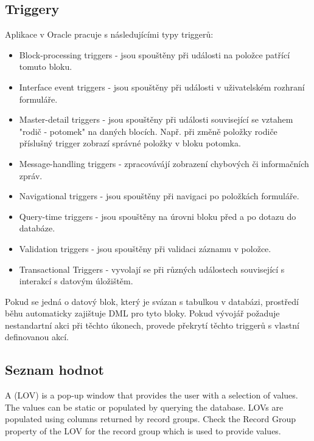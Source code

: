 \documentclass{bakalarka}
\begin{document}
\subsection{Triggery}
Aplikace v Oracle pracuje s následujícími typy triggerů:
\begin{itemize}
\item Block-processing triggers - jsou spouštěny při události na položce patřící tomuto bloku.
\item Interface event triggers - jsou spouštěny při události v uživatelském rozhraní formuláře.
\item Master-detail triggers - jsou spouštěny při události související se vztahem "rodič - potomek"  na daných blocích. Např. při změně položky rodiče příslušný trigger zobrazí správné položky v bloku potomka.
\item Message-handling triggers - zpracovávájí zobrazení chybových či informačních zpráv.
\item Navigational triggers - jsou spouštěny při navigaci po položkách formuláře.
\item Query-time triggers - jsou spouštěny na úrovni bloku před a po dotazu do databáze.
\item Validation triggers - jsou spouštěny při validaci záznamu v položce.
\item Transactional Triggers - vyvolají se při různých událostech související s interakcí s datovým úložištěm.
\end{itemize}
Pokud se jedná o datový blok, který je svázan s tabulkou v databázi, prostředí běhu automaticky zajištuje DML pro tyto bloky.
Pokud vývojář požaduje nestandartní akci při těchto úkonech, provede překrytí těchto triggerů s vlastní definovanou akcí.

\subsection{Seznam hodnot}
A (LOV) is a pop-up window that provides the user with a selection of values. The values can be static or populated by querying the database. LOVs are populated using columns returned by record groups. Check the Record Group property of the LOV for the record group which is used to provide values.
\end{document}
